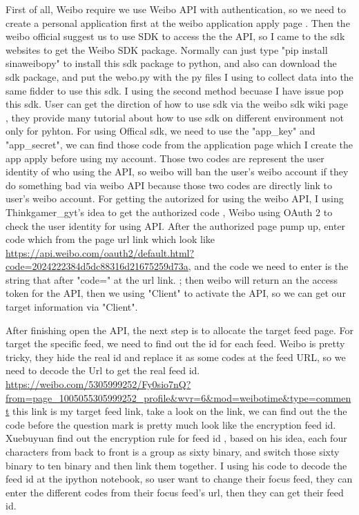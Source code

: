 \documentclass[sigconf]{acmart}
\begin{document}
First of all, Weibo require we use Weibo API with authentication, so we need to create a personal application first at the weibo application apply page \cite{method:01}. Then the weibo official suggest us to use SDK to access the the API, so I came to the sdk websites \cite{method:03} to get the Weibo SDK package. Normally can just type "pip install sinaweibopy" to install this sdk package to python, and also can download the sdk package, and put the webo.py with the py files I using to collect data into the same fidder to use this sdk. I using the second method becuase I have issue pop this sdk. User can get the dirction of how to use sdk via the weibo sdk wiki page \cite{method:04}, they provide many tutorial about how to use sdk on different environment not only for pyhton.  For using Offical sdk, we need to use the "app\_key" and "app\_secret", we can find those code from the application page which I create the app apply before using my account. Those two codes are represent the user identity of who using the API, so weibo will ban the user's weibo account if they do something bad via weibo API because those two codes are directly link to user's weibo account. For getting the autorized for using the weibo API, I using Thinkgamer\_gyt's idea to get the authorized code \cite{method:05}, Weibo using OAuth 2 to check the user identity for using API. After the authorized page pump up, enter code which from the page url link which look like 
\url{https://api.weibo.com/oauth2/default.html?code=2024222384d5dc88316d21675259d73a}, and the code we need to enter is the string that after "code=" at the url link.
; then weibo will return an the access token for the API, then we using "Client" to activate the API, so we can get our target information via "Client".

After finishing open the API, the next step is to allocate the target feed page. For target the specific feed, we need to find out the id for each feed. Weibo is pretty tricky, they hide the real id and replace it as some codes at the feed URL, so we need to decode the Url to get the real feed id. 
\url{https://weibo.com/5305999252/Fy0sio7nQ?from=page_1005055305999252_profile&wvr=6&mod=weibotime&type=comment}
this link is my target feed link, take a look on the link, we can find out the the code before the question mark is pretty much look like the encryption feed id. Xuebuyuan find out the encryption rule for feed id \cite{method:02}, based on his idea, each four characters from back to front is a group as sixty binary, and switch those sixty binary to ten binary and then link them together. I using his code to decode the feed id at the ipython notebook, so user want to change their focus feed, they can enter the different codes from their focus feed's url, then they can get their feed id. 
\end{document}
